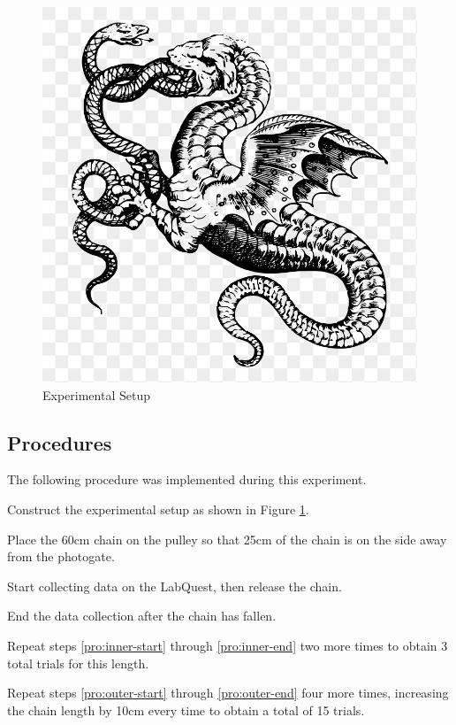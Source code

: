 \documentclass[stu,biblatex,floatsintext,draftall]{apa7}
\begin{document}
\begin{figure}[H]
	\centering
	\caption{Experimental Setup}
	\label{fig:setup}
	\includegraphics{dragon}
\end{figure}

\subsection{Procedures}
The following procedure was implemented during this experiment.
\begin{APAenumerate}
	\item Construct the experimental setup as shown in Figure \ref{fig:setup}.
	\item\label{pro:outer-start} Place the 60\unit{\centi\meter} chain on the pulley so that 25\unit{\centi\meter} of the chain is on the side away from the photogate.
	\item\label{pro:inner-start} Start collecting data on the LabQuest, then release the chain.
	\item\label{pro:inner-end} End the data collection after the chain has fallen.
	\item\label{pro:outer-end} Repeat steps \ref{pro:inner-start} through \ref{pro:inner-end} two more times to obtain 3 total trials for this length.
	\item Repeat steps \ref{pro:outer-start} through \ref{pro:outer-end} four more times, increasing the chain length by 10\unit{\centi\meter} every time to obtain a total of 15 trials.
\end{APAenumerate}
\end{document}
